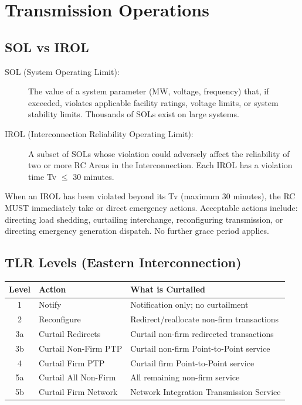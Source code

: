 \documentclass[12pt,twoside,openright]{memoir}
\begin{document}
\chapter{Transmission Operations}
\label{ch:transmission}

\section{SOL vs IROL}

\begin{description}
  \item[SOL (System Operating Limit):] The value of a system parameter (MW, voltage,
        frequency) that, if exceeded, violates applicable facility ratings, voltage limits,
        or system stability limits. Thousands of SOLs exist on large systems.

  \item[IROL (Interconnection Reliability Operating Limit):] A subset of SOLs whose
        violation could adversely affect the reliability of two or more RC Areas in the
        Interconnection. Each IROL has a violation time Tv $\leq$ 30 minutes.
\end{description}

\begin{criticalbox}
When an IROL has been violated beyond its Tv (maximum 30 minutes), the RC MUST
immediately take or direct emergency actions. Acceptable actions include: directing
load shedding, curtailing interchange, reconfiguring transmission, or directing
emergency generation dispatch. No further grace period applies.
\end{criticalbox}

\section{TLR Levels (Eastern Interconnection)}

\begin{center}
\begin{tabular}{@{}clp{7cm}@{}}
\toprule
\rowcolor{nercblue!15}
\textbf{Level} & \textbf{Action} & \textbf{What is Curtailed} \\
\midrule
1 & Notify & Notification only; no curtailment \\
\rowcolor{rowlight}
2 & Reconfigure & Redirect/reallocate non-firm transactions \\
3a & Curtail Redirects & Curtail non-firm redirected transactions \\
\rowcolor{rowlight}
3b & Curtail Non-Firm PTP & Curtail non-firm Point-to-Point service \\
4 & Curtail Firm PTP & Curtail firm Point-to-Point service \\
\rowcolor{rowlight}
5a & Curtail All Non-Firm & All remaining non-firm service \\
5b & Curtail Firm Network & Network Integration Transmission Service \\
\bottomrule
\end{tabular}
\end{center}
\end{document}

